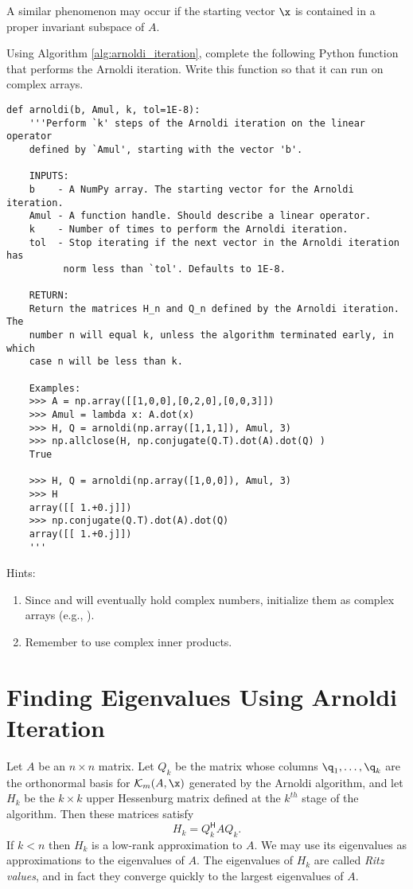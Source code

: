 A similar phenomenon may occur if the starting vector $\x$ is contained in a proper invariant subspace of $A$.

\begin{problem}\label{prob:arnoldi}
Using Algorithm \ref{alg:arnoldi_iteration}, complete the following Python function that performs the Arnoldi iteration.
Write this function so that it can run on complex arrays.
\begin{lstlisting}
def arnoldi(b, Amul, k, tol=1E-8):
    '''Perform `k' steps of the Arnoldi iteration on the linear operator 
    defined by `Amul', starting with the vector 'b'.
    
    INPUTS:
    b    - A NumPy array. The starting vector for the Arnoldi iteration.
    Amul - A function handle. Should describe a linear operator.
    k    - Number of times to perform the Arnoldi iteration.
    tol  - Stop iterating if the next vector in the Arnoldi iteration has 
          norm less than `tol'. Defaults to 1E-8.
    
    RETURN:
    Return the matrices H_n and Q_n defined by the Arnoldi iteration. The 
    number n will equal k, unless the algorithm terminated early, in which 
    case n will be less than k.
    
    Examples:
    >>> A = np.array([[1,0,0],[0,2,0],[0,0,3]])
    >>> Amul = lambda x: A.dot(x)
    >>> H, Q = arnoldi(np.array([1,1,1]), Amul, 3)
    >>> np.allclose(H, np.conjugate(Q.T).dot(A).dot(Q) )
    True
    
    >>> H, Q = arnoldi(np.array([1,0,0]), Amul, 3)
    >>> H
    array([[ 1.+0.j]])
    >>> np.conjugate(Q.T).dot(A).dot(Q)
    array([[ 1.+0.j]])
    '''
\end{lstlisting}
Hints: 
\begin{enumerate}
\item Since  and  will eventually hold complex numbers, initialize them as complex arrays (e.g., ). 
\item Remember to use complex inner products. 
\end{enumerate}
\end{problem}



\section*{Finding Eigenvalues Using Arnoldi Iteration}
Let $A$ be an $n \times n$ matrix. 
Let $Q_k$ be the matrix whose columns $\q_1, \ldots, \q_k$ are the orthonormal basis for $\mathcal{K}_m(A, \x)$ generated by the Arnoldi algorithm, and
let $H_k$ be the $k\times k$ upper Hessenburg matrix defined at the $k^{th}$ stage of the algorithm.
Then these matrices satisfy
\begin{equation}\label{equ:hqa}
H_k = Q_k^{\mathsf H} A Q_k.
\end{equation}
If $k<n$ then $H_k$ is a low-rank approximation to $A$.
We may use its eigenvalues as approximations to the eigenvalues of $A$.
The eigenvalues of $H_k$ are called \emph{Ritz values}, and in fact they converge quickly to the largest eigenvalues of $A$.

